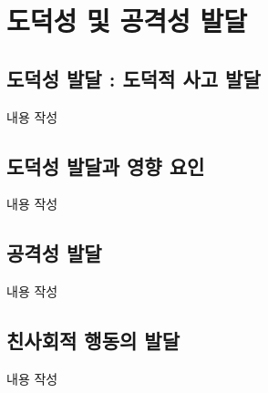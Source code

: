 \section{도덕성 및 공격성 발달}

\subsection{도덕성 발달 : 도덕적 사고 발달}
내용 작성

\subsection{도덕성 발달과 영향 요인}
내용 작성

\subsection{공격성 발달}
내용 작성

\subsection{친사회적 행동의 발달}
내용 작성
